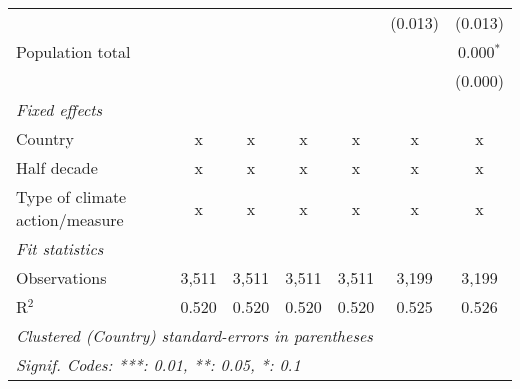 \begin{tabular}{lcccccc}
                                           &         &         &         &               & (0.013)       & (0.013)\\   
   Population total                        &         &         &         &               &               & 0.000$^{*}$\\   
                                           &         &         &         &               &               & (0.000)\\   
   \emph{Fixed effects}\\
   Country                                 & x       & x       & x       & x             & x             & x\\  
   Half decade                             & x       & x       & x       & x             & x             & x\\  
   Type of climate action/measure          & x       & x       & x       & x             & x             & x\\  
   \midrule \emph{Fit statistics}\\
   Observations                            & 3,511   & 3,511   & 3,511   & 3,511         & 3,199         & 3,199\\  
   R$^2$                                   & 0.520   & 0.520   & 0.520   & 0.520         & 0.525         & 0.526\\  
   \midrule
   \multicolumn{7}{l}{\emph{Clustered (Country) standard-errors in parentheses}}\\
   \multicolumn{7}{l}{\emph{Signif. Codes: ***: 0.01, **: 0.05, *: 0.1}}\\
\end{tabular}
\par\endgroup


